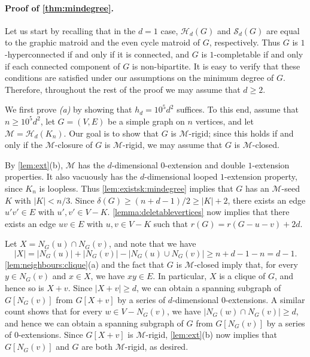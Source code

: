 \documentclass[11pt,a4paper,dvipsnames]{scrartcl}
\newcommand{\cH}{{\mathcal{H}}}
\newcommand{\cM}{{\mathcal{M}}}
\begin{document}
\paragraph*{Proof of \texorpdfstring{\cref{thm:mindegree}}{Theorem 1.1}.} \hspace{-1em}
Let us start by recalling that in the $d=1$ case, $\mathcal{H}_d(G)$ and $\mathcal{S}_d(G)$ are equal to the graphic matroid and the even cycle matroid of $G$, respectively. Thus $G$ is $1$-hyperconnected if and only if it is connected, and $G$ is $1$-completable if and only if each connected component of $G$ is non-bipartite. It is easy to verify that these conditions are satisfied under our assumptions on the minimum degree of $G$. Therefore, throughout the rest of the proof we may assume that $d \geq 2$.

We first prove \emph{(a)} by showing that $h_d=10^5d^2$ suffices.
To this end, assume that $n \geq 10^5d^2$, let $G = (V,E)$ be a simple graph on $n$ vertices, and let $\cM = \cH_d(K_n)$. Our goal is to show that $G$ is $\cM$-rigid; since this holds if and only if the $\cM$-closure of $G$ is $\cM$-rigid, we may assume that $G$ is $\cM$-closed. 

By \cref{lem:ext}(b), $\cM$ has the $d$-dimensional $0$-extension and double $1$-extension properties. It also vacuously has the $d$-dimensional looped $1$-extension property, since $K_n$ is loopless. Thus 
\cref{lem:existsk:mindegree}
implies that $G$ has an $\cM$-seed $K$ with $|K| < n/3$. Since $\delta(G)\geq (n+d - 1)/2 \geq |K|+2$, there exists an edge $u'v'\in E$ with $u',v'\in V-K$. \cref{lemma:deletablevertices} now implies that there exists an edge $uv \in E$ with $u,v \in V-K$ such that $r(G) = r(G-u-v) + 2d$.

Let $X = N_G(u) \cap N_G(v)$, and note that we have
\[|X| = |N_G(u)| + |N_G(v)| - |N_G(u) \cup N_G(v)| \geq n+d - 1 - n = d - 1.\]
\cref{lem:neighbours:clique}(a) and the fact that $G$ is $\cM$-closed imply that, for every $y \in N_G(v)$ and $x \in X$, we have $xy \in E$. In particular, $X$ is a clique of $G$, and hence so is $X+v$. Since $|X+v| \geq d$, we can obtain a spanning subgraph of $G[N_G(v)]$ from $G[X+v]$ by a series of $d$-dimensional $0$-extensions. A similar count shows that for every $w \in V - N_G(v)$, we have $|N_G(w) \cap N_G(v)| \geq d$, and hence we can obtain a spanning subgraph of $G$ from $G[N_G(v)]$ by a series of $0$-extensions. Since $G[X+v]$ is $\cM$-rigid, \cref{lem:ext}(b) now implies that $G[N_G(v)]$ and $G$ are both $\cM$-rigid, as desired.
\end{document}
